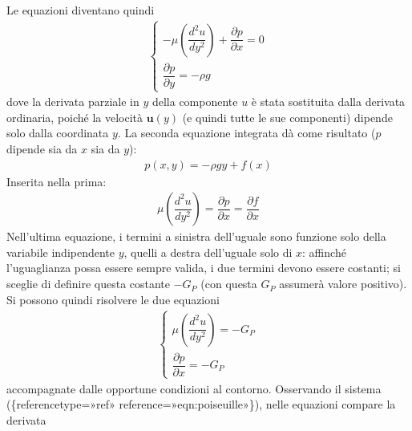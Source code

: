 \documentclass[letterpaper,10pt,italian]{jupyterBook}
\begin{document}
\sphinxAtStartPar
Le equazioni diventano quindi
\begin{equation*}
\begin{split}\begin{cases}\label{eqn:poiseuille}
- \mu \left( \dfrac{d^2 u}{d y^2} \right)
  + \dfrac{\partial p}{\partial x} = 0 \\
 \dfrac{\partial p}{\partial y} = - \rho g
\end{cases}\end{split}
\end{equation*}
\sphinxAtStartPar
dove la derivata parziale in \(y\) della componente \(u\) è
stata sostituita dalla derivata ordinaria, poiché la velocità
\(\mathbf{u}(y)\) (e quindi tutte le sue componenti) dipende solo dalla
coordinata \(y\). La seconda equazione integrata dà come risultato (\(p\)
dipende sia da \(x\) sia da \(y\)):
\begin{equation*}
\begin{split}p(x,y) = -\rho g y + f(x)\end{split}
\end{equation*}
\sphinxAtStartPar
Inserita
nella prima:
\begin{equation*}
\begin{split}\mu \left( \dfrac{d^2 u}{d y^2} \right) =
 \dfrac{\partial p}{\partial x} = \dfrac{\partial f}{\partial x}\end{split}
\end{equation*}
\sphinxAtStartPar
Nell’ultima equazione, i termini a sinistra dell’uguale sono funzione
solo della variabile indipendente \(y\), quelli a destra dell’uguale solo
di \(x\): affinché l’uguaglianza possa essere sempre valida, i due termini
devono essere costanti; si sceglie di definire questa costante \(-G_P\)
(con questa \(G_P\) assumerà valore positivo). Si possono quindi risolvere
le due equazioni
\begin{equation*}
\begin{split}\label{eqn:poiseuille2}
\begin{cases}
  \mu \left( \dfrac{d^2 u}{d y^2} \right) = - G_P \\
  \dfrac{\partial p}{\partial x} = -G_P
\end{cases}\end{split}
\end{equation*}
\sphinxAtStartPar
accompagnate dalle opportune condizioni al contorno.
Osservando il sistema
(\{reference\sphinxhyphen{}type=»ref»
reference=»eqn:poiseuille»\}), nelle equazioni compare la derivata
\end{document}
